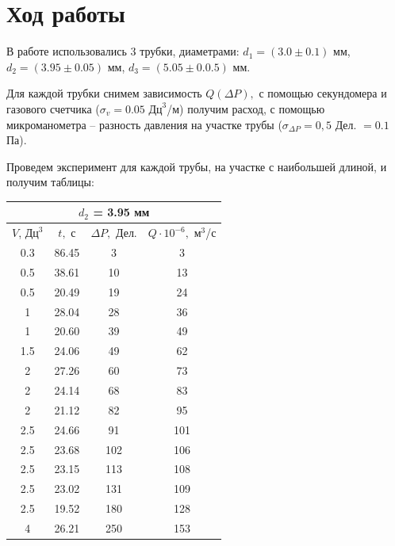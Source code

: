 \documentclass[a4paper,12pt]{article}
\theoremstyle{definition}
\begin{document}
	\section{Ход работы}
	
	В работе использовались 3 трубки, диаметрами: $d_1 = (3.0\pm0.1)$ мм, $d_2 = (3.95\pm0.05)$ мм, $d_3 = (5.05\pm0.0.5)$ мм.
	
	Для каждой трубки снимем зависимость $Q(\Delta P),$ с помощью секундомера и газового счетчика ($\sigma_v = 0.05\text{ Дц}^3$/м) получим расход, с помощью микроманометра -- разность давления на участке трубы ($\sigma_{\Delta P} = 0,5$ Дел. $ = 0.1$ Па).
	
	Проведем эксперимент для каждой трубы, на участке с наибольшей длиной, и получим таблицы:
	
	\begin{table}[H]
		\bgroup
		\def\arraystretch{1.0}%
		\centering
		\begin{minipage}{.49\linewidth}
			\centering
			\begin{tabular}{|c|c|c|c|}
				\hline
				\multicolumn{4}{|c|}{$d_2$ = 3.95 мм }\\ \hline
				$V$, $\text{Дц}^3$& $t,$ с&$\Delta P,$ Дел.  & $Q\cdot 10^{-6},$ $\text{м}^3$/с\\ \hline
				0.3 & 86.45 & 3 & 3 \\ \hline
				0.5 & 38.61 & 10 & 13 \\ \hline
				0.5 & 20.49 & 19 & 24 \\ \hline
				1 & 28.04 & 28 & 36 \\ \hline
				1 & 20.60 & 39 & 49 \\ \hline
				1.5 & 24.06 & 49 & 62 \\ \hline
				2 & 27.26 & 60 & 73 \\ \hline \hline
				2 & 24.14 & 68 & 83 \\ \hline
				2 & 21.12 & 82 & 95 \\ \hline
				2.5 & 24.66 & 91 & 101 \\ \hline
				2.5 & 23.68 & 102 & 106 \\ \hline
				2.5 & 23.15 & 113 & 108 \\ \hline
				2.5 & 23.02 & 131 & 109 \\ \hline
				2.5 & 19.52 & 180 & 128 \\ \hline
				4 & 26.21 & 250 & 153 \\ \hline
			\end{tabular}
		\end{minipage}
		\begin{minipage}{.49\linewidth}

\end{minipage}
\end{table}
\end{document}
